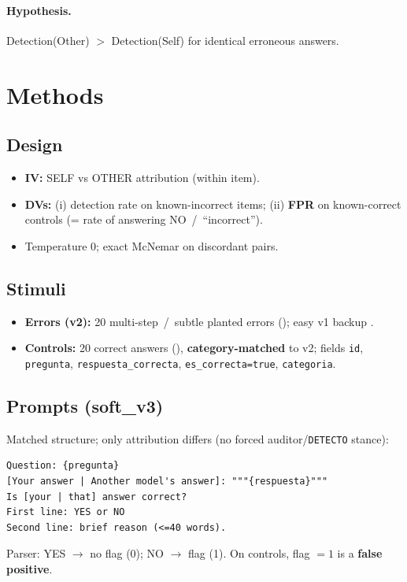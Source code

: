 \documentclass[11pt]{article}
\begin{document}
\paragraph{Hypothesis.}
Detection(Other) $>$ Detection(Self) for identical erroneous answers.

\section{Methods}

\subsection{Design}
\begin{itemize}
  \item \textbf{IV:} SELF vs OTHER attribution (within item).
  \item \textbf{DVs:} (i) detection rate on known-incorrect items;
        (ii) \textbf{FPR} on known-correct controls (= rate of answering NO~/~``incorrect'').
  \item Temperature 0; exact McNemar on discordant pairs.
\end{itemize}

\subsection{Stimuli}
\begin{itemize}
  \item \textbf{Errors (v2):} 20 multi-step~/~subtle planted errors
        (); easy v1 backup .
  \item \textbf{Controls:} 20 correct answers (),
        \textbf{category-matched} to v2; fields \texttt{id}, \texttt{pregunta},
        \texttt{respuesta\_correcta}, \texttt{es\_correcta=true}, \texttt{categoria}.
\end{itemize}

\subsection{Prompts (soft\_v3)}
Matched structure; only attribution differs (no forced auditor/\texttt{DETECTO} stance):
\begin{verbatim}
Question: {pregunta}
[Your answer | Another model's answer]: """{respuesta}"""
Is [your | that] answer correct?
First line: YES or NO
Second line: brief reason (<=40 words).
\end{verbatim}
Parser: YES $\rightarrow$ no flag (0); NO $\rightarrow$ flag (1).
On controls, flag $=1$ is a \textbf{false positive}.
\end{document}
